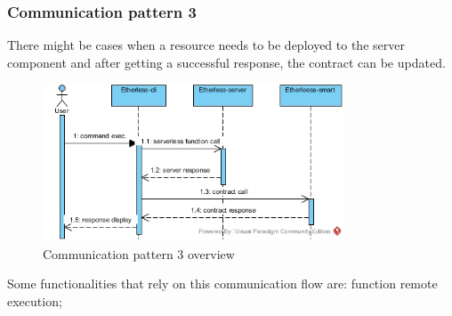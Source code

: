 \subsubsection{Communication pattern 3}
There might be cases when a resource needs to be deployed to the server component and after getting a successful response, the contract can be updated.
\begin{figure}[!h]
	\centering
	\includegraphics[width=0.8\textwidth]{res/img/pattern3.jpg}
	\caption{Communication pattern 3 overview}
\end{figure}
Some functionalities that rely on this communication flow are: function remote execution; 